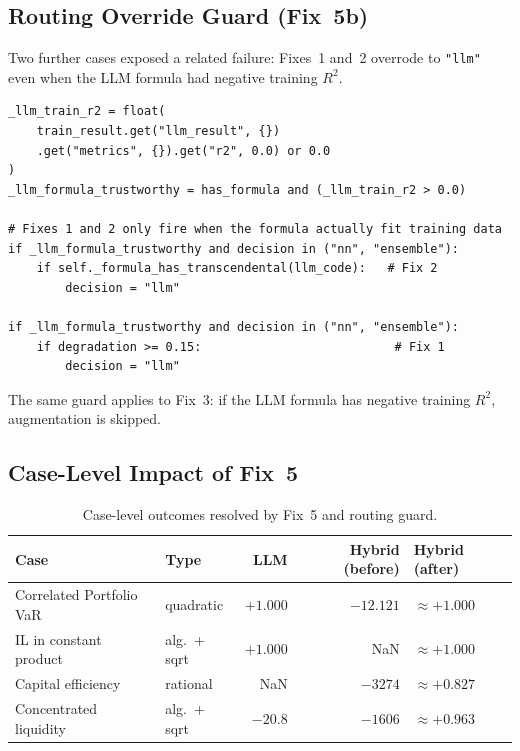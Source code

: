 \documentclass[11pt,a4paper]{article}
\begin{document}
\subsection{Routing Override Guard (Fix~5b)}

Two further cases exposed a related failure: Fixes~1 and~2 overrode to
\texttt{"llm"} even when the LLM formula had negative training $R^2$.

\begin{lstlisting}[caption={LLM-formula trustworthiness guard.}]
_llm_train_r2 = float(
    train_result.get("llm_result", {})
    .get("metrics", {}).get("r2", 0.0) or 0.0
)
_llm_formula_trustworthy = has_formula and (_llm_train_r2 > 0.0)

# Fixes 1 and 2 only fire when the formula actually fit training data
if _llm_formula_trustworthy and decision in ("nn", "ensemble"):
    if self._formula_has_transcendental(llm_code):   # Fix 2
        decision = "llm"

if _llm_formula_trustworthy and decision in ("nn", "ensemble"):
    if degradation >= 0.15:                           # Fix 1
        decision = "llm"
\end{lstlisting}

The same guard applies to Fix~3: if the LLM formula has negative training
$R^2$, augmentation is skipped.

\subsection{Case-Level Impact of Fix~5}

\begin{table}[h]
\centering
\caption{Case-level outcomes resolved by Fix~5 and routing guard.}
\label{tab:fix5_cases}
\begin{tabular}{llrrl}
\toprule
\textbf{Case} & \textbf{Type} & \textbf{LLM} & \textbf{Hybrid (before)} & \textbf{Hybrid (after)} \\
\midrule
Correlated Portfolio VaR & quadratic     & $+1.000$ & $-12.121$ & $\approx+1.000$ \\
IL in constant product   & alg.\ + sqrt  & $+1.000$ & NaN       & $\approx+1.000$ \\
Capital efficiency       & rational      & NaN      & $-3274$   & $\approx+0.827$ \\
Concentrated liquidity   & alg.\ + sqrt  & $-20.8$  & $-1606$   & $\approx+0.963$ \\
\bottomrule
\end{tabular}
\end{table}
\end{document}
